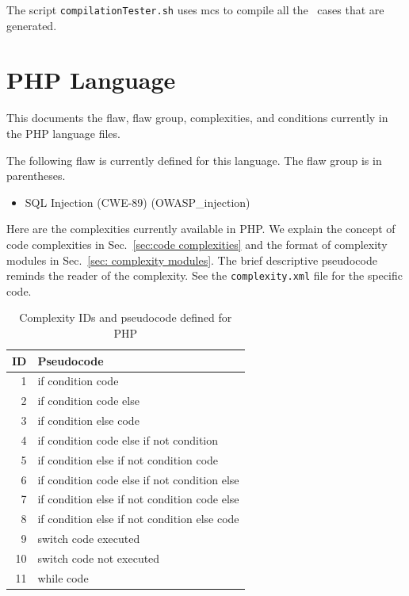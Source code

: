 \begin{appendices}
The script \verb|compilationTester.sh| uses mcs to compile all the
\CSharp\ cases that are generated.

\section{PHP Language}
\label{sec:PHP language}

This documents the flaw, flaw group, complexities, and conditions currently in the
PHP language files.

The following flaw is currently defined for this language.  The flaw group is in
parentheses.
\begin{itemize}
    \item SQL Injection (CWE-89) (OWASP\_injection)
\end{itemize}

\newpage

Here are the complexities currently available in PHP.
We explain the concept of code complexities in Sec.~\ref{sec:code complexities} and
the format of complexity modules in Sec.~\ref{sec: complexity modules}.
The brief descriptive pseudocode reminds the reader of the complexity.
See the \verb|complexity.xml| file for the specific code.

\begin{table}[H]
\centering
\caption{Complexity IDs and pseudocode defined for PHP}
\begin{tabular}{|r|l|}
\hline
\textbf{ID} & \textbf{Pseudocode} \\
\hline
 1 & if condition code \\
\hline
 2 & if condition code else \\
\hline
 3 & if condition else code \\
\hline
 4 & if condition code else if not condition \\
\hline
 5 & if condition else if not condition code \\
\hline
 6 & if condition code else if not condition else \\
\hline
 7 & if condition else if not condition code else \\
 \hline
 8 & if condition else if not condition else code \\
\hline
 9 & switch code executed \\
\hline
10 & switch code not executed \\
\hline
11 & while code \\
\hline


\end{tabular}
\end{table}
\end{appendices}
